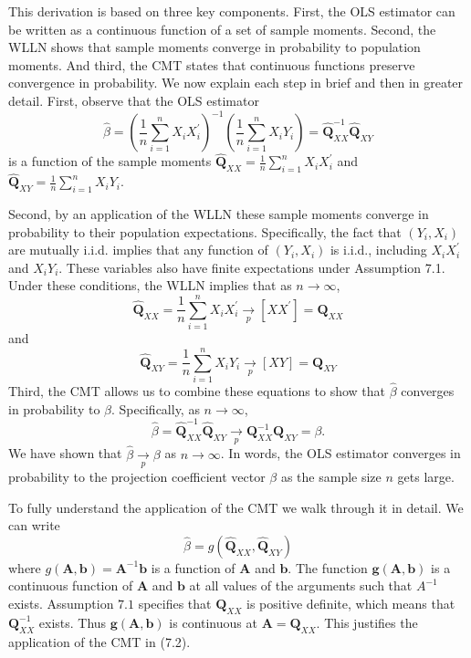 \documentclass[10pt]{article}
\begin{document}
This derivation is based on three key components. First, the OLS estimator can be written as a continuous function of a set of sample moments. Second, the WLLN shows that sample moments converge in probability to population moments. And third, the CMT states that continuous functions preserve convergence in probability. We now explain each step in brief and then in greater detail. First, observe that the OLS estimator
$$
\widehat{\beta}=\left(\frac{1}{n} \sum_{i=1}^{n} X_{i} X_{i}^{\prime}\right)^{-1}\left(\frac{1}{n} \sum_{i=1}^{n} X_{i} Y_{i}\right)=\widehat{\boldsymbol{Q}}_{X X}^{-1} \widehat{\boldsymbol{Q}}_{X Y}
$$
is a function of the sample moments $\widehat{\boldsymbol{Q}}_{X X}=\frac{1}{n} \sum_{i=1}^{n} X_{i} X_{i}^{\prime}$ and $\widehat{\boldsymbol{Q}}_{X Y}=\frac{1}{n} \sum_{i=1}^{n} X_{i} Y_{i}$.

Second, by an application of the WLLN these sample moments converge in probability to their population expectations. Specifically, the fact that $\left(Y_{i}, X_{i}\right)$ are mutually i.i.d. implies that any function of $\left(Y_{i}, X_{i}\right)$ is i.i.d., including $X_{i} X_{i}^{\prime}$ and $X_{i} Y_{i}$. These variables also have finite expectations under Assumption 7.1. Under these conditions, the WLLN implies that as $n \rightarrow \infty$,
$$
\widehat{\boldsymbol{Q}}_{X X}=\frac{1}{n} \sum_{i=1}^{n} X_{i} X_{i}^{\prime} \underset{p}{\longrightarrow}\left[X X^{\prime}\right]=\boldsymbol{Q}_{X X}
$$
and
$$
\widehat{\boldsymbol{Q}}_{X Y}=\frac{1}{n} \sum_{i=1}^{n} X_{i} Y_{i} \underset{p}{\longrightarrow}[X Y]=\boldsymbol{Q}_{X Y}
$$
Third, the CMT allows us to combine these equations to show that $\widehat{\beta}$ converges in probability to $\beta$. Specifically, as $n \rightarrow \infty$,
$$
\widehat{\beta}=\widehat{\boldsymbol{Q}}_{X X}^{-1} \widehat{\boldsymbol{Q}}_{X Y} \underset{p}{\longrightarrow} \boldsymbol{Q}_{X X}^{-1} \boldsymbol{Q}_{X Y}=\beta .
$$
We have shown that $\widehat{\beta} \underset{p}{\rightarrow} \beta$ as $n \rightarrow \infty$. In words, the OLS estimator converges in probability to the projection coefficient vector $\beta$ as the sample size $n$ gets large.

To fully understand the application of the CMT we walk through it in detail. We can write
$$
\widehat{\beta}=g\left(\widehat{\boldsymbol{Q}}_{X X}, \widehat{\boldsymbol{Q}}_{X Y}\right)
$$
where $g(\boldsymbol{A}, \boldsymbol{b})=\boldsymbol{A}^{-1} \boldsymbol{b}$ is a function of $\boldsymbol{A}$ and $\boldsymbol{b}$. The function $\boldsymbol{g}(\boldsymbol{A}, \boldsymbol{b})$ is a continuous function of $\boldsymbol{A}$ and $\boldsymbol{b}$ at all values of the arguments such that $A^{-1}$ exists. Assumption $7.1$ specifies that $\boldsymbol{Q}_{X X}$ is positive definite, which means that $\boldsymbol{Q}_{X X}^{-1}$ exists. Thus $\boldsymbol{g}(\boldsymbol{A}, \boldsymbol{b})$ is continuous at $\boldsymbol{A}=\boldsymbol{Q}_{X X}$. This justifies the application of the CMT in (7.2).
\end{document}
